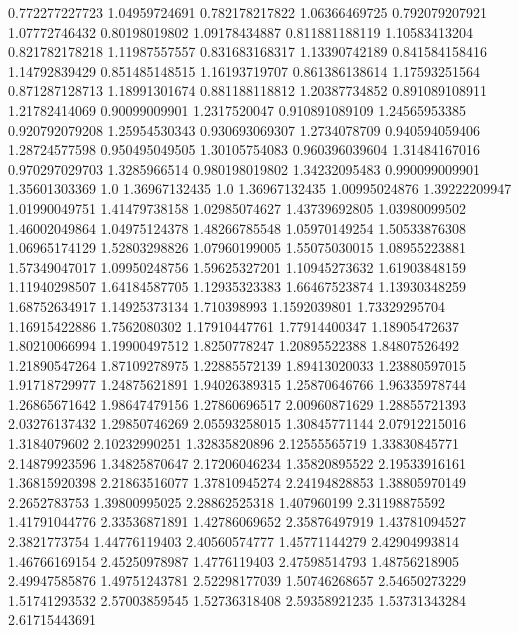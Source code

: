  0.772277227723    1.04959724691
 0.782178217822    1.06366469725
 0.792079207921    1.07772746432
  0.80198019802    1.09178434887
 0.811881188119    1.10583413204
 0.821782178218    1.11987557557
 0.831683168317    1.13390742189
 0.841584158416    1.14792839429
 0.851485148515    1.16193719707
 0.861386138614    1.17593251564
 0.871287128713    1.18991301674
 0.881188118812    1.20387734852
 0.891089108911    1.21782414069
  0.90099009901     1.2317520047
 0.910891089109    1.24565953385
 0.920792079208    1.25954530343
 0.930693069307     1.2734078709
 0.940594059406    1.28724577598
 0.950495049505    1.30105754083
 0.960396039604    1.31484167016
 0.970297029703     1.3285966514
 0.980198019802    1.34232095483
 0.990099009901    1.35601303369
            1.0    1.36967132435
            1.0    1.36967132435
  1.00995024876    1.39222209947
  1.01990049751    1.41479738158
  1.02985074627    1.43739692805
  1.03980099502    1.46002049864
  1.04975124378    1.48266785548
  1.05970149254    1.50533876308
  1.06965174129    1.52803298826
  1.07960199005    1.55075030015
  1.08955223881    1.57349047017
  1.09950248756    1.59625327201
  1.10945273632    1.61903848159
  1.11940298507    1.64184587705
  1.12935323383    1.66467523874
  1.13930348259    1.68752634917
  1.14925373134      1.710398993
   1.1592039801    1.73329295704
  1.16915422886     1.7562080302
  1.17910447761    1.77914400347
  1.18905472637    1.80210066994
  1.19900497512     1.8250778247
  1.20895522388    1.84807526492
  1.21890547264    1.87109278975
  1.22885572139    1.89413020033
  1.23880597015    1.91718729977
  1.24875621891    1.94026389315
  1.25870646766    1.96335978744
  1.26865671642    1.98647479156
  1.27860696517    2.00960871629
  1.28855721393    2.03276137432
  1.29850746269    2.05593258015
  1.30845771144    2.07912215016
   1.3184079602    2.10232990251
  1.32835820896    2.12555565719
  1.33830845771    2.14879923596
  1.34825870647    2.17206046234
  1.35820895522    2.19533916161
  1.36815920398    2.21863516077
  1.37810945274    2.24194828853
  1.38805970149     2.2652783753
  1.39800995025    2.28862525318
    1.407960199    2.31198875592
  1.41791044776    2.33536871891
  1.42786069652    2.35876497919
  1.43781094527     2.3821773754
  1.44776119403    2.40560574777
  1.45771144279    2.42904993814
  1.46766169154    2.45250978987
   1.4776119403    2.47598514793
  1.48756218905    2.49947585876
  1.49751243781    2.52298177039
  1.50746268657    2.54650273229
  1.51741293532    2.57003859545
  1.52736318408    2.59358921235
  1.53731343284    2.61715443691
